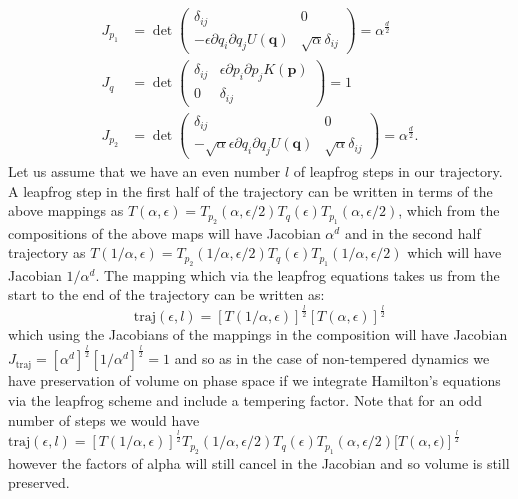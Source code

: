 \documentclass[12pt]{article}
\begin{document}
    \begin{align}
        J_{p_1} & = \det\begin{pmatrix} \delta_{ij} & 0 \\ -\epsilon\partial q_i \partial q_j U\left(\bm{q}\right) & \sqrt{\alpha}\delta_{ij} \end{pmatrix} = \alpha^\frac{d}{2} \\
        J_{q} & = \det\begin{pmatrix} \delta_{ij} & \epsilon\partial p_i \partial p_j K\left(\bm{p}\right) \\ 0 & \delta_{ij} \end{pmatrix} = 1 \\
        J_{p_2} & = \det\begin{pmatrix} \delta_{ij} & 0 \\ -\sqrt{\alpha}\epsilon\partial q_i \partial q_j U\left(\bm{q}\right) & \sqrt{\alpha}\delta_{ij} \end{pmatrix} = \alpha^\frac{d}{2}.
    \end{align}
    Let us assume that we have an even number $l$ of leapfrog steps in our trajectory. A leapfrog step in the first half of the trajectory can be written in terms of the above mappings as $T\left(\alpha,\epsilon\right) = T_{p_2}\left(\alpha,\epsilon/2\right)T_q\left(\epsilon\right)T_{p_1}\left(\alpha,\epsilon/2\right)$, which from the compositions of the above maps will have Jacobian $ \alpha^d $ and in the second half trajectory as $T\left(1/\alpha,\epsilon\right) = T_{p_2}\left(1/\alpha,\epsilon/2\right)T_q\left(\epsilon\right)T_{p_1}\left(1/\alpha,\epsilon/2\right)$ which will have Jacobian $1/\alpha^{d}$. The mapping which via the leapfrog equations takes us from the start to the end of the trajectory can be written as:
    \begin{equation}
        \text{traj}\left(\epsilon,l\right)=\left[T\left(1/\alpha,\epsilon\right)\right]^{\frac{l}{2}}\left[T\left(\alpha,\epsilon\right)\right]^{\frac{l}{2}}
    \end{equation}
    which using the Jacobians of the mappings in the composition will have Jacobian $J_{\text{traj}}=\left[\alpha^d\right]^{\frac{l}{2}}\left[1/\alpha^d\right]^{\frac{l}{2}} = 1$ and so as in the case of non-tempered dynamics we have preservation of volume on phase space if we integrate Hamilton's equations via the leapfrog scheme and include a tempering factor. Note that for an odd number of steps we would have $\text{traj}\left(\epsilon,l\right)=\left[T\left(1/\alpha,\epsilon\right)\right]^{\frac{l}{2}} T_{p_2}\left(1/\alpha,\epsilon/2\right)T_q\left(\epsilon\right)T_{p_1}\left(\alpha,\epsilon/2\right)[T\left(\alpha,\epsilon)\right]^{\frac{l}{2}}$ however the factors of alpha will still cancel in the Jacobian and so volume is still preserved.
\end{document}
